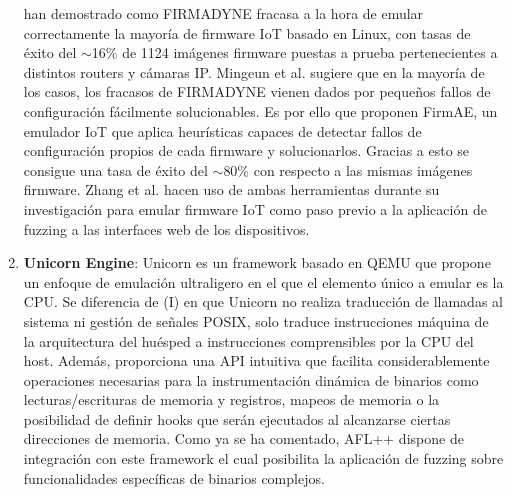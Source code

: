 \begin{enumerate}[I]
    han demostrado como FIRMADYNE\cite{Chen2016} fracasa a la hora de emular correctamente la mayoría de firmware IoT basado en Linux, con tasas de éxito del
    $\sim$16\%\cite{Kim2020} de 1124 imágenes firmware puestas a prueba pertenecientes a distintos routers y cámaras IP. Mingeun et al.\cite{Kim2020} 
    sugiere que en la mayoría de los casos, los fracasos de FIRMADYNE\cite{Chen2016} vienen dados por pequeños fallos de configuración fácilmente 
    solucionables. Es por ello que proponen FirmAE, un emulador IoT que aplica heurísticas capaces de detectar fallos de configuración propios de cada
    firmware y solucionarlos. Gracias a esto se consigue una tasa de éxito del $\sim$80\% con respecto a las mismas imágenes firmware.
    Zhang et al.\cite{Zhang2021} hacen uso de ambas herramientas durante su investigación para emular firmware IoT como paso previo a la aplicación de
    fuzzing a las interfaces web de los dispositivos.
    \item \textbf{Unicorn Engine}: Unicorn\cite{unicorn} es un framework basado en QEMU que propone un enfoque de emulación ultraligero en el que el elemento único a 
    emular es la CPU. Se diferencia de (I) en que Unicorn no realiza traducción de llamadas al sistema ni gestión de señales POSIX, solo traduce instrucciones 
    máquina de la arquitectura del huésped a instrucciones comprensibles por la CPU del host. Además, proporciona una API intuitiva que facilita 
    considerablemente operaciones necesarias para la instrumentación dinámica de binarios como lecturas/escrituras de memoria y registros, mapeos de memoria o 
    la posibilidad de definir hooks que serán ejecutados al alcanzarse ciertas direcciones de memoria. Como ya se ha comentado, AFL++ dispone de integración 
    con este framework el cual posibilita la aplicación de fuzzing sobre funcionalidades específicas de binarios complejos.\bigskip 
    

\end{enumerate}

